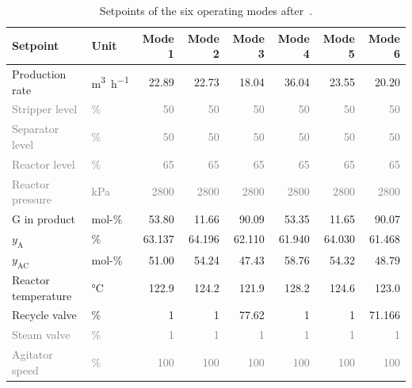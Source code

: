 \begin{table}[tb]
    \centering
    \caption{Setpoints of the six operating modes after~\cite{reinartz.2021}.}
    \label{tab:modes_setpoints}
    \newcommand{\const}[1]{\textcolor{gray}{#1}}
    \begin{tabular}{llrrrrrr}
        \toprule
        Setpoint & Unit & Mode 1 & Mode 2 & Mode 3 & Mode 4 & Mode 5 & Mode 6 \\
        \midrule
        Production rate            & \si{\metre\cubed\per\hour} & 22.89  & 22.73  & 18.04  & 36.04  & 23.55  & 20.20  \\
        \const{Stripper level}     & \const{\si{\percent}}      & \const{50}   & \const{50}   & \const{50}   & \const{50}   & \const{50}   & \const{50}   \\
        \const{Separator level}    & \const{\si{\percent}}      & \const{50}   & \const{50}   & \const{50}   & \const{50}   & \const{50}   & \const{50}   \\
        \const{Reactor level}      & \const{\si{\percent}}      & \const{65}   & \const{65}   & \const{65}   & \const{65}   & \const{65}   & \const{65}   \\
        \const{Reactor pressure}   & \const{\si{\kilo\pascal}}  & \const{2800} & \const{2800} & \const{2800} & \const{2800} & \const{2800} & \const{2800} \\
        G in product               & mol-\%                     & 53.80  & 11.66  & 90.09  & 53.35  & 11.65  & 90.07  \\
        $y_\mathrm{A}$             & \si{\percent}              & 63.137 & 64.196 & 62.110 & 61.940 & 64.030 & 61.468 \\
        $y_\mathrm{AC}$            & mol-\%                     & 51.00  & 54.24  & 47.43  & 58.76  & 54.32  & 48.79  \\
        Reactor temperature        & \si{\celsius}              & 122.9  & 124.2  & 121.9  & 128.2  & 124.6  & 123.0  \\
        Recycle valve              & \si{\percent}              & 1      & 1      & 77.62  & 1      & 1      & 71.166 \\
        \const{Steam valve}        & \const{\si{\percent}}      & \const{1}    & \const{1}    & \const{1}    & \const{1}    & \const{1}    & \const{1}    \\
        \const{Agitator speed}     & \const{\si{\percent}}      & \const{100}  & \const{100}  & \const{100}  & \const{100}  & \const{100}  & \const{100}  \\
        \bottomrule
    \end{tabular}
\end{table}
